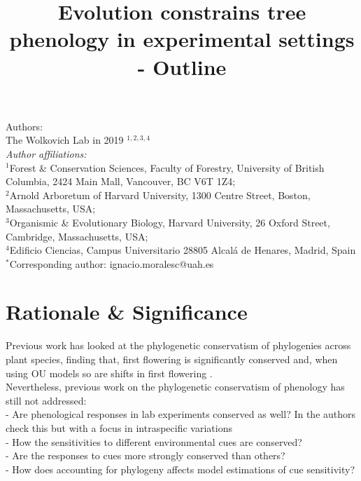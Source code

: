 \documentclass{article}\usepackage[]{graphicx}\usepackage[]{color}
\title{Evolution constrains tree phenology in experimental settings - Outline}
\begin{document}
\maketitle

\noindent Authors:\\
The Wolkovich Lab in 2019 $^{1,2,3,4}$
\vspace{2ex}\\
\emph{Author affiliations:}\\
$^{1}$Forest \& Conservation Sciences, Faculty of Forestry, University of British Columbia, 2424 Main Mall, Vancouver, BC V6T 1Z4;\\
$^{2}$Arnold Arboretum of Harvard University, 1300 Centre Street, Boston, Massachusetts, USA;\\
$^{3}$Organismic \& Evolutionary Biology, Harvard University, 26 Oxford Street, Cambridge, Massachusetts, USA;\\
$^{4}$Edificio Ciencias, Campus Universitario 28805 Alcalá de Henares, Madrid, Spain\\
 

\vspace{2ex}
$^*$Corresponding author: ignacio.moralesc@uah.es\\
\renewcommand{\thetable}{\arabic{table}}
\renewcommand{\thefigure}{\arabic{figure}}
\renewcommand{\labelitemi}{$-$}

\clearpage
\section*{Rationale \& Significance}

Previous work has looked at the phylogenetic conservatism of phylogenies across plant species, finding that, first flowering is significantly conserved \citep{davies2013phylogenetic} and, when using OU models so are shifts in first flowering \citep{rafferty2017global}.\\ 

Nevertheless, previous work on the phylogenetic conservatism of phenology has still not addressed:\\
- Are phenological responses in lab experiments conserved as well? In \cite{joly2019importance} the authors check this but with a focus in intraspecific variations\\
- How the sensitivities to different environmental cues are conserved?\\
- Are the responses to cues more strongly conserved than others?\\
- How does accounting for phylogeny affects model estimations of cue sensitivity?\\
\end{document}
